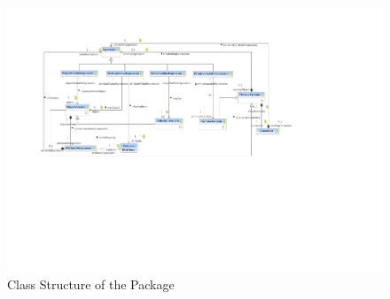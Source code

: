 %
%

\begin{figure}[htbp]
  \centering
  \includegraphics[width=\textheight,angle=90]{figures/A_technical-reference/packages/storydiagrams_patterns_expressions/storydiagrams-patterns-expressions}
  \caption{Class Structure of the  Package}
  \label{fig:MM:patterns:expressions}
\end{figure}